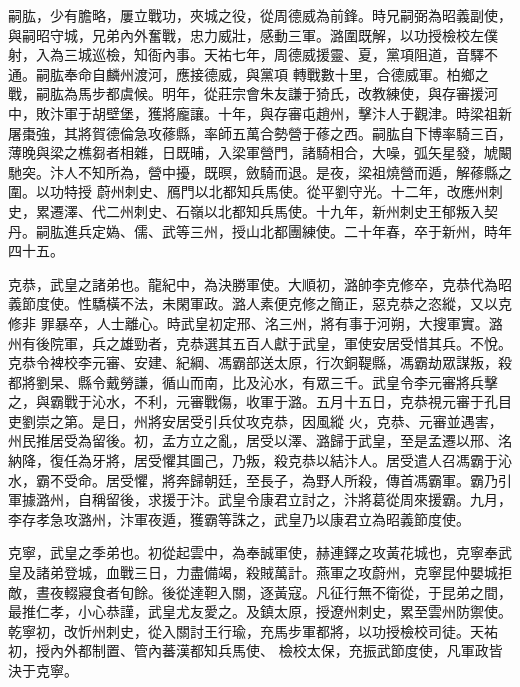 \begin{pinyinscope}
 嗣肱，少有膽略，屢立戰功，夾城之役，從周德威為前鋒。時兄嗣弼為昭義副使，與嗣昭守城，兄弟內外奮戰，忠力威壯，感動三軍。潞圍既解，以功授檢校左僕射，入為三城巡檢，知衙內事。天祐七年，周德威援靈、夏，黨項阻道，音驛不通。嗣肱奉命自麟州渡河，應接德威，與黨項
 轉戰數十里，合德威軍。柏鄉之戰，嗣肱為馬步都虞候。明年，從莊宗會朱友謙于猗氏，改教練使，與存審援河中，敗汴軍于胡壁堡，獲將龐讓。十年，與存審屯趙州，擊汴人于觀津。時梁祖新屠棗強，其將賀德倫急攻蓚縣，率師五萬合勢營于蓚之西。嗣肱自下博率騎三百，薄晚與梁之樵芻者相雜，日既晡，入梁軍營門，諸騎相合，大噪，弧矢星發，虓闞馳突。汴人不知所為，營中擾，既暝，斂騎而退。是夜，梁祖燒營而遁，解蓚縣之圍。以功特授
 蔚州刺史、鴈門以北都知兵馬使。從平劉守光。十二年，改應州刺史，累遷澤、代二州刺史、石嶺以北都知兵馬使。十九年，新州刺史王郁叛入契丹。嗣肱進兵定媯、儒、武等三州，授山北都團練使。二十年春，卒于新州，時年四十五。



 克恭，武皇之諸弟也。龍紀中，為決勝軍使。大順初，潞帥李克修卒，克恭代為昭義節度使。性驕橫不法，未閑軍政。潞人素便克修之簡正，惡克恭之恣縱，又以克修非
 罪暴卒，人士離心。時武皇初定邢、洺三州，將有事于河朔，大搜軍實。潞州有後院軍，兵之雄勁者，克恭選其五百人獻于武皇，軍使安居受惜其兵。不悅。克恭令裨校李元審、安建、紀綱、馮霸部送太原，行次銅鞮縣，馮霸劫眾謀叛，殺都將劉杲、縣令戴勞謙，循山而南，比及沁水，有眾三千。武皇令李元審將兵擊之，與霸戰于沁水，不利，元審戰傷，收軍于潞。五月十五日，克恭視元審于孔目吏劉崇之第。是日，州將安居受引兵仗攻克恭，因風縱
 火，克恭、元審並遇害，州民推居受為留後。初，孟方立之亂，居受以澤、潞歸于武皇，至是孟遷以邢、洺納降，復任為牙將，居受懼其圖己，乃叛，殺克恭以結汴人。居受遣人召馮霸于沁水，霸不受命。居受懼，將奔歸朝廷，至長子，為野人所殺，傳首馮霸軍。霸乃引軍據潞州，自稱留後，求援于汴。武皇令康君立討之，汴將葛從周來援霸。九月，李存孝急攻潞州，汴軍夜遁，獲霸等誅之，武皇乃以康君立為昭義節度使。



 克寧，武皇之季弟也。初從起雲中，為奉誠軍使，赫連鐸之攻黃花城也，克寧奉武皇及諸弟登城，血戰三日，力盡備竭，殺賊萬計。燕軍之攻蔚州，克寧昆仲嬰城拒敵，晝夜輟寢食者旬餘。後從達靼入關，逐黃寇。凡征行無不衛從，于昆弟之間，最推仁孝，小心恭謹，武皇尤友愛之。及鎮太原，授遼州刺史，累至雲州防禦使。乾寧初，改忻州刺史，從入關討王行瑜，充馬步軍都將，以功授檢校司徒。天祐初，授內外都制置、管內蕃漢都知兵馬使、
 檢校太保，充振武節度使，凡軍政皆決于克寧。




\end{pinyinscope}
